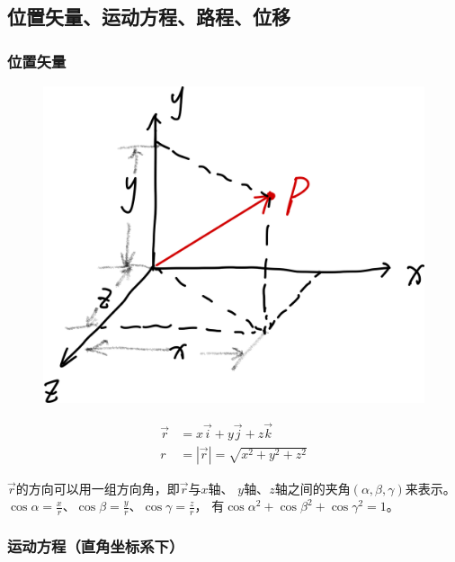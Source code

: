 \documentclass[
	12pt, %
	a4paper, %
]{myLegrandOrangeBook}
\begin{document}
\subsection{位置矢量、运动方程、路程、位移}

\subsubsection*{位置矢量}

    \begin{figure}
        \centering
        \includegraphics[scale=0.08]{"Chapter 01 images/pic1.png"}
        \label{pic1}
    \end{figure}

    \begin{align}
        \overrightarrow{r} &= x\overrightarrow{i} + y\overrightarrow{j} + z\overrightarrow{k} \\
        r &= \left|\overrightarrow{r}\right| = \sqrt{x^2 + y^2 + z^2}
    \end{align}

    \(\overrightarrow{r}\)的方向可以用一组方向角，即\(\overrightarrow{r}\)与\(x\)轴、
    \(y\)轴、\(z\)轴之间的夹角\(\left(\alpha, \beta, \gamma\right)\)来表示。
    \(\cos \alpha = \frac{x}{r}\)、\(\cos \beta = \frac{y}{r}\)、\(\cos \gamma = \frac{z}{r}\)，
    有\(\cos \alpha ^2 + \cos \beta ^2 + \cos \gamma ^2 = 1\)。

\subsubsection*{运动方程（直角坐标系下）}
    
\end{document}
